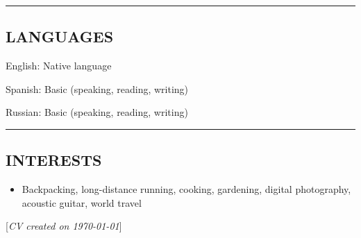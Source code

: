 \documentclass[10pt,letterpaper,MMMyyyy,nonstop]{simpleresumecv}
\newcommand{\CVNote}{CV created on {\today}}
\newenvironment{indentsection}[1]%
{\begin{list}{}%
    {\setlength{\leftmargin}{#1}}%
    \item[]%
}
{\end{list}}
\begin{document}
\hrule
\vspace{-0.4em}
\subsection*{LANGUAGES}

\begin{indentsection}{\parindent}
    \begin{description*}
        \item[English:]
        Native language
        \item[Spanish:]
        Basic (speaking, reading, writing)
        \item[Russian:]
        Basic (speaking, reading, writing)
    \end{description*}
\end{indentsection}





\hrule
\vspace{-0.4em}
\subsection*{INTERESTS}

\begin{itemize}
    \item Backpacking, long-distance running, cooking, gardening, digital photography, acoustic guitar, world travel
\end{itemize}



\null\hfill%
[\textit{\CVNote}]%
\hspace{2.0mm}\null
\end{document}
